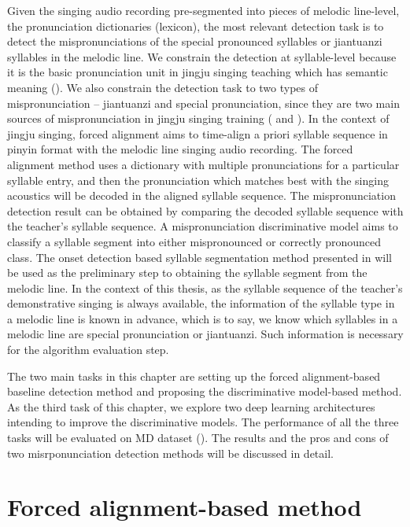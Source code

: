 Given the singing audio recording pre-segmented into pieces of melodic line-level, the pronunciation dictionaries (lexicon), the most relevant detection task is to detect the mispronunciations of the special pronounced syllables or jiantuanzi syllables in the melodic line. We constrain the detection at syllable-level because it is the basic pronunciation unit in jingju singing teaching which has semantic meaning (). We also constrain the detection task to two types of mispronunciation -- jiantuanzi and special pronunciation, since they are two main sources of mispronunciation in jingju singing training ( and ). In the context of jingju singing, forced alignment aims to time-align a priori syllable sequence in pinyin format with the melodic line singing audio recording. The forced alignment method uses a dictionary with multiple pronunciations for a particular syllable entry, and then the pronunciation which matches best with the singing acoustics will be decoded in the aligned syllable sequence. The mispronunciation detection result can be obtained by comparing the decoded syllable sequence with the teacher's syllable sequence. A mispronunciation discriminative model aims to classify a syllable segment into either mispronounced or correctly pronounced class. The onset detection based syllable segmentation method presented in  will be used as the preliminary step to obtaining the syllable segment from the melodic line. In the context of this thesis, as the syllable sequence of the teacher's demonstrative singing is always available, the information of the syllable type in a melodic line is known in advance, which is to say, we know which syllables in a melodic line are special pronunciation or jiantuanzi. Such information is necessary for the algorithm evaluation step.

The two main tasks in this chapter are setting up the forced alignment-based baseline detection method and proposing the discriminative model-based method. As the third task of this chapter, we explore two deep learning architectures intending to improve the discriminative models. The performance of all the three tasks will be evaluated on MD dataset (). The results and the pros and cons of two misrponunciation detection methods will be discussed in detail.

\section{Forced alignment-based method}\label{sec:ch6:forced_alignment}


